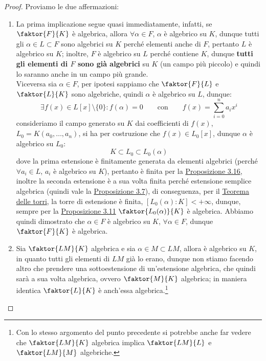 \documentclass[11pt]{scrartcl}
\begin{document}
\begin{proof}
    Proviamo le due affermazioni:
    \begin{enumerate}[(1)]
        \item La prima implicazione segue quasi immediatamente, infatti, se $\faktor{F}{K}$ è algebrica, allora $\forall \alpha \in F$, $\alpha$ è algebrico su $K$,
            dunque tutti gli $\alpha \in L \subset F$ sono algebrici su $K$ perché elementi anche di $F$, pertanto $L$ è algebrico su $K$; inoltre, $F$ è algebrico su $L$ perché
            contiene $K$, dunque \textbf{tutti gli elementi di $F$ sono già algebrici} su $K$ (un campo più piccolo) e quindi lo saranno anche in un campo più grande.\\
            Viceversa sia $\alpha \in F$, per ipotesi sappiamo che $\faktor{F}{L}$ e $\faktor{L}{K}$ sono algebriche, quindi $\alpha$ è algebrico su $L$, dunque:
            \[ \exists f(x) \in L[x]\setminus\{0\} : f(\alpha) = 0 \qquad \text{con} \qquad f(x) = \sum_{i=0}^n a_ix^i
                \]
            consideriamo il campo generato su $K$ dai coefficienti di $f(x)$, $L_0=K(a_0,\ldots,a_n)$, si ha per costruzione che $f(x) \in L_0[x]$, dunque $\alpha$ è algebrico su $L_0$:
            \[ K \subset L_0 \subset L_0(\alpha)
                \]
            dove la prima estensione è finitamente generata da elementi algebrici (perché $\forall a_i \in L$, $a_i$ è algebrico su $K$), pertanto è finita per la \hyperref[3.16]{Proposizione 3.16}, inoltre la seconda 
            estensione è a sua volta finita perché estensione semplice algebrica (quindi vale la \hyperref[3.7]{Proposizione 3.7}), di conseguenza, per il \hyperref[torri]{Teorema delle torri}, la torre di estensione è finita,
            $[L_0(\alpha) : K] < +\infty$, dunque, sempre per la \hyperref[3.11]{Proposizione 3.11} $\faktor{L_0(\alpha)}{K}$ è algebrica. Abbiamo quindi dimostrato che $\alpha \in F$ è algebrico su $K$, $\forall \alpha \in F$,
            dunque $\faktor{F}{K}$ è algebrica.
        \item Sia $\faktor{LM}{K}$ algebrica e sia $\alpha \in M \subset LM$, allora è algebrico su $K$, in quanto tutti gli elementi di $LM$ già lo erano, dunque non stiamo facendo altro che prendere una sottoestensione di un'estensione algebrica, che quindi 
        sarà a sua volta algebrica, ovvero $\faktor{M}{K}$ algebrica; in maniera identica $\faktor{L}{K}$ è anch'essa algebrica.\footnote{Con lo stesso argomento del punto precedente si potrebbe anche far vedere che $\displaystyle\faktor{LM}{K}$ algebrica implica $\displaystyle\faktor{LM}{L}$ e $\displaystyle\faktor{LM}{M}$ algebriche.}\\

\end{enumerate}
\end{proof}
\end{document}
